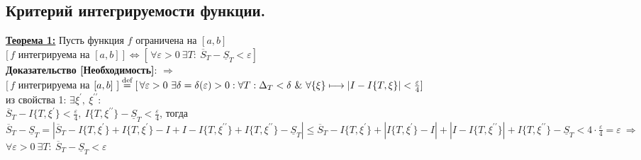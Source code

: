 \documentclass[a4paper,12pt]{article} %
\renewcommand {\leq}{\leqslant}
\begin{document}
	\subsection{Критерий интегрируемости функции.}
	
	
	\underline{\textbf{Теорема 1:}} Пусть функция $f$ ограничена на $[a,b]$\\
	$[\,f$ интегрируема на $[a,b]~]\, \Leftrightarrow [\,\forall\varepsilon>0~\exists T:~\overline{S}_T-\underline{S}_T<\varepsilon]\,$\\
	
	\textbf{Доказательство [Необходимость]}: $\Rightarrow$\\
	$[\,f$ интегрируема на $[a,b]~] \stackrel{\text{def}}{=}[\,\forall\varepsilon>0~\exists\delta=\delta(\varepsilon)>0: \forall T:\\\Delta_{T}<\delta~\&~ \forall\{\xi\} \longmapsto|I-I\{T, \xi\}|<\frac{\varepsilon}{4}]\,$\\
	из свойства 1: $\exists \xi^{\prime},~\xi^{\prime\prime}$:\\
	$ \overline{S}_T - I\{T,\xi^{\prime}\}<\frac{\varepsilon}{4},~I\{T,\xi^{\prime\prime}\}-\underline{S}_T<\frac{\varepsilon}{4}$, тогда\\
	$\overline{S}_T-\underline{S}_T=|\overline{S}_T-I\{T,\xi^{\prime}\}+I\{T,\xi^{\prime}\}-I+I-I\{T,\xi^{\prime\prime}\}+I\{T,\xi^{\prime\prime}\}-\underline{S}_T|\leq \overline{S}_T-I\{T,\xi^{\prime}\}+|I\{T,\xi^{\prime}\}-I|+|I-I\{T,\xi^{\prime\prime}\}|+I\{T,\xi^{\prime\prime}\}-\underline{S}_T<4\cdot \frac{\varepsilon}{4}=\varepsilon~\Rightarrow$\\
	$\forall\varepsilon>0~\exists T:~\overline{S}_T-\underline{S}_T<\varepsilon$\\
	
\end{document}

